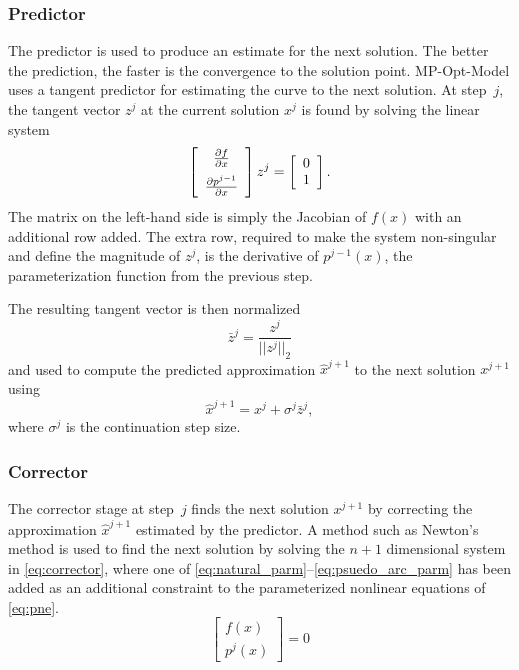 \documentclass[12pt]{article}
\newcommand{\mpom}[0]{\mbox{MP-Opt-Model}}
\newcommand{\der}[2]{\frac{\partial{#1}}{\partial{#2}}} %
\numberwithin{equation}{section}
\numberwithin{table}{section}
\numberwithin{figure}{section}
\begin{document}
\subsubsection{Predictor}
The predictor is used to produce an estimate for the next solution. The better the prediction, the faster is the convergence to the solution point. \mpom{} uses a tangent predictor for estimating the curve to the next solution. At step~$j$, the tangent vector $z^j$ at the current solution $x^j$ is found by solving the linear system
\begin{equation}
\left[ \begin{array}{c}
  \der{f}{x} \\[\medskipamount]
  \der{p^{j-1}}{x}
\end{array} \right] z^j =
\left[ \begin{array}{c}
  0 \\
  1  \end{array} \right].
\label{eq:tangent_predictor}
\end{equation}
The matrix on the left-hand side is simply the Jacobian of $f(x)$ with an additional row added. The extra row, required to make the system non-singular and define the magnitude of $z^j$, is the derivative of $p^{j-1}(x)$, the parameterization function from the previous step.

The resulting tangent vector is then normalized
\begin{equation}
\bar{z}^j = \frac{z^j}{|| z^j ||_2}
\end{equation}
and used to compute the predicted approximation $\hat{x}^{j+1}$ to the next solution ${x}^{j+1}$ using
\begin{equation}
\hat{x}^{j+1} = x^j + \sigma^j \bar{z}^j,
\end{equation}
where $\sigma^j$ is the continuation step size.

\subsubsection{Corrector}
The corrector stage at step~$j$ finds the next solution $x^{j+1}$ by correcting the approximation $\hat{x}^{j+1}$ estimated by the predictor. A method such as Newton's method is used to find the next solution by solving the $n+1$ dimensional system in \eqref{eq:corrector}, where one of \eqref{eq:natural_parm}--\eqref{eq:psuedo_arc_parm} has been added as an additional constraint to the parameterized nonlinear equations of \eqref{eq:pne}.
\begin{equation} \left[\begin{array}{c}
 f(x) \\
 p^j(x)
 \end{array} \right] = 0
 \label{eq:corrector}
\end{equation}
\end{document}
